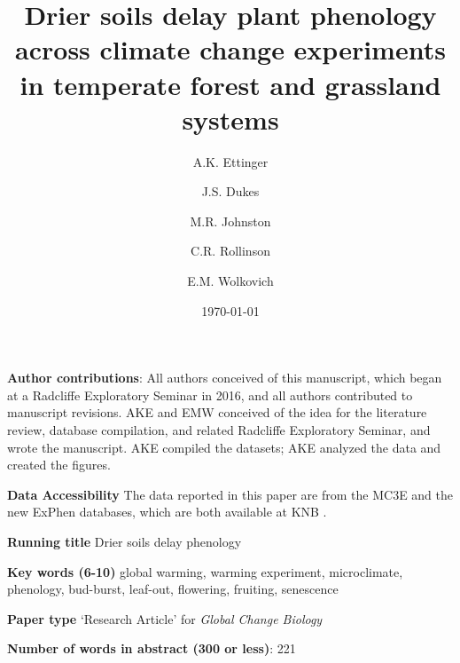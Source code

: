 \documentclass{article}
\begin{document}



\title{Drier soils delay plant phenology across climate change experiments in temperate forest and grassland systems} 
\author[1,2,a]{A.K. Ettinger}
\author[3,b]{J.S. Dukes}
\author[4,c]{M.R. Johnston}
\author[5,d]{C.R. Rollinson}
\author[1,4,6,e]{E.M. Wolkovich}









\date{\today}
\maketitle 
\textbf{Author contributions}: All authors conceived of this manuscript, which began at a Radcliffe Exploratory Seminar in 2016, and all authors contributed to manuscript revisions. AKE and EMW conceived of the idea for the literature review, database compilation, and related Radcliffe Exploratory Seminar, and wrote the manuscript. AKE compiled the datasets; AKE analyzed the data and created the figures.

\textbf{Data Accessibility} 
The data reported in this paper are from the MC3E and the new ExPhen databases, which are both available at KNB \citep{ettinger2018,ettinger2022}. 

\textbf{Running title} Drier soils delay phenology

\textbf{Key words (6-10)} global warming, warming experiment, microclimate, phenology, bud-burst, leaf-out, flowering, fruiting, senescence 


\textbf{Paper type} `Research Article' for \textit{Global Change Biology} %

\textbf{Number of words in abstract (300 or less)}: 221 
\end{document}
